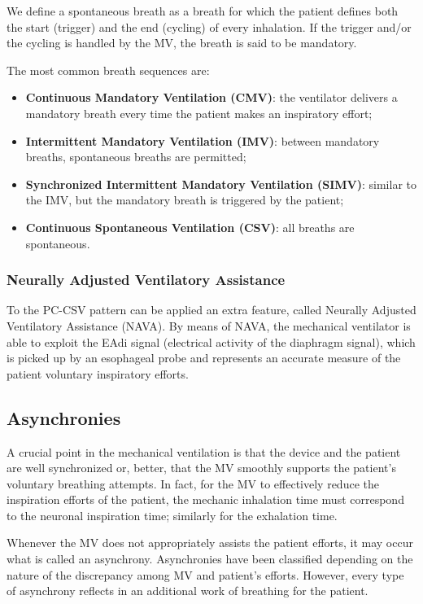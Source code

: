 \documentclass[a4paper, twoside]{article}
\begin{document}
    We define a spontaneous breath as a breath for which the patient defines both the start (trigger) and the end (cycling) of every inhalation. If the trigger and/or the cycling is handled by the MV, the breath is said to be mandatory.

    The most common breath sequences are:

    \begin{itemize}
        \item \textbf{Continuous Mandatory Ventilation (CMV)}: the ventilator delivers a mandatory breath every time the patient makes an inspiratory effort;
        \item \textbf{Intermittent Mandatory Ventilation (IMV)}: between mandatory breaths, spontaneous breaths are permitted;
        \item \textbf{Synchronized Intermittent Mandatory Ventilation (SIMV)}: similar to the IMV, but the mandatory breath is triggered by the patient;
        \item \textbf{Continuous Spontaneous Ventilation (CSV)}: all breaths are spontaneous.
    \end{itemize}

    \subsubsection{Neurally Adjusted Ventilatory Assistance}
    To the PC-CSV pattern can be applied an extra feature, called Neurally Adjusted Ventilatory Assistance (NAVA). By means of NAVA, the mechanical ventilator is able to exploit the EAdi signal (electrical activity of the diaphragm signal), which is picked up by an esophageal probe and represents an accurate measure of the patient voluntary inspiratory efforts.

    \subsection{Asynchronies}
    A crucial point in the mechanical ventilation is that the device and the patient are well synchronized or, better, that the MV smoothly supports the patient's voluntary breathing attempts. In fact, for the MV to effectively reduce the inspiration efforts of the patient, the mechanic inhalation time must correspond to the neuronal inspiration time; similarly for the exhalation time.

    Whenever the MV does not appropriately assists the patient efforts, it may occur what is called an asynchrony. Asynchronies have been classified depending on the nature of the discrepancy among MV and patient's efforts. However, every type of asynchrony reflects in an additional work of breathing for the patient.
\end{document}

